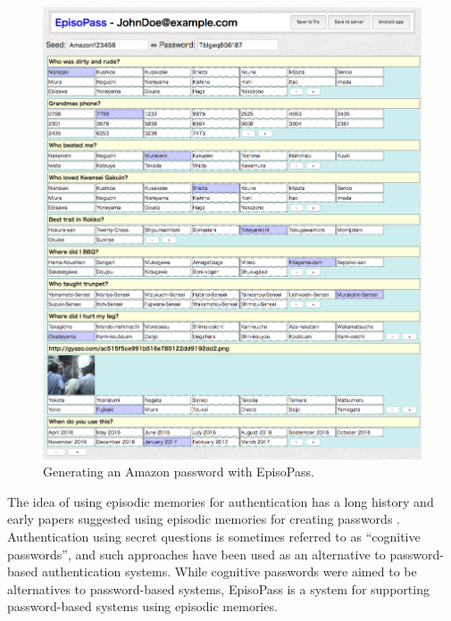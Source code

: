 \documentclass[runningheads,a4paper]{llncs}
\begin{document}
\begin{figure}
\centering
\includegraphics[width=1.0\columnwidth]{figures/4d13e6804ba790624c1f8e2b8255bde5}
\caption{Generating an Amazon password with EpisoPass.}
\label{web1}
\end{figure}


The idea of using episodic memories for authentication has a long
history and early papers suggested using episodic memories for
creating passwords \cite{Barton:Password}.
Authentication using secret questions is sometimes
referred to as ``cognitive
passwords''\cite{Zviran:1990:UAC:100512.100538}, and such approaches
have been used as an alternative to password-based authentication
systems.
%
While cognitive passwords were aimed to be alternatives to
password-based systems, EpisoPass is a system for supporting
password-based systems using episodic memories.
\end{document}
